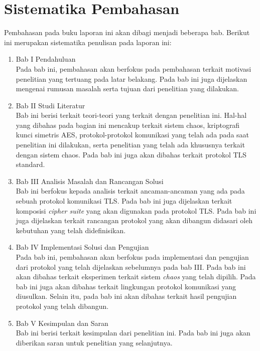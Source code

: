 \section{Sistematika Pembahasan}
Pembahasan pada buku laporan ini akan dibagi menjadi beberapa bab. Berikut ini merupakan sistematika penulisan pada laporan ini:

\begin{enumerate}
  \item Bab I Pendahuluan\\
  Pada bab ini, pembahasan akan berfokus pada pembahasan terkait motivasi penelitian yang tertuang pada latar belakang. Pada bab ini juga dijelaskan mengenai rumusan masalah serta tujuan dari penelitian yang dilakukan.

  \item Bab II Studi Literatur\\
  Bab ini berisi terkait teori-teori yang terkait dengan penelitian ini. Hal-hal yang dibahas pada bagian ini mencakup terkait sistem chaos, kriptografi kunci simetris AES, protokol-protokol komunikasi yang telah ada pada saat penelitian ini dilakukan, serta penelitian yang telah ada khususnya terkait dengan sistem chaos. Pada bab ini juga akan dibahas terkait protokol TLS standard.

  \item Bab III Analisis Masalah dan Rancangan Solusi\\
  Bab ini berfokus kepada analisis terkait ancaman-ancaman yang ada pada sebuah protokol komunikasi TLS. Pada bab ini juga dijelaskan terkait komposisi \emph{cipher suite} yang akan digunakan pada protokol TLS. Pada bab ini juga dijelaskan terkait rancangan protokol yang akan dibangun didasari oleh kebutuhan yang telah didefinisikan.

  \item Bab IV Implementasi Solusi dan Pengujian\\
  Pada bab ini, pembahasan akan berfokus pada implementasi dan pengujian dari protokol yang telah dijelaskan sebelumnya pada bab III. Pada bab ini akan dibahas terkait eksperimen terkait sistem \emph{chaos} yang telah dipilih. Pada bab ini juga akan dibahas terkait lingkungan protokol komunikasi yang diusulkan. Selain itu, pada bab ini akan dibahas terkait hasil pengujian protokol yang telah dibangun.

  \item Bab V Kesimpulan dan Saran\\
  Bab ini berisi terkait kesimpulan dari penelitian ini. Pada bab ini juga akan diberikan saran untuk penelitian yang selanjutnya.
\end{enumerate}
